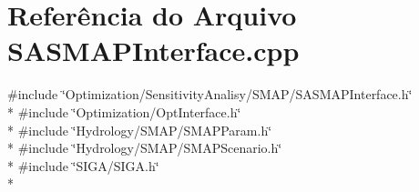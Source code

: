 \section{Referência do Arquivo S\+A\+S\+M\+A\+P\+Interface.\+cpp}
\label{_s_a_s_m_a_p_interface_8cpp}
{\ttfamily \#include \char`\"{}Optimization/\+Sensitivity\+Analisy/\+S\+M\+A\+P/\+S\+A\+S\+M\+A\+P\+Interface.\+h\char`\"{}}\\*
{\ttfamily \#include \char`\"{}Optimization/\+Opt\+Interface.\+h\char`\"{}}\\*
{\ttfamily \#include \char`\"{}Hydrology/\+S\+M\+A\+P/\+S\+M\+A\+P\+Param.\+h\char`\"{}}\\*
{\ttfamily \#include \char`\"{}Hydrology/\+S\+M\+A\+P/\+S\+M\+A\+P\+Scenario.\+h\char`\"{}}\\*
{\ttfamily \#include \char`\"{}S\+I\+G\+A/\+S\+I\+G\+A.\+h\char`\"{}}\\*
